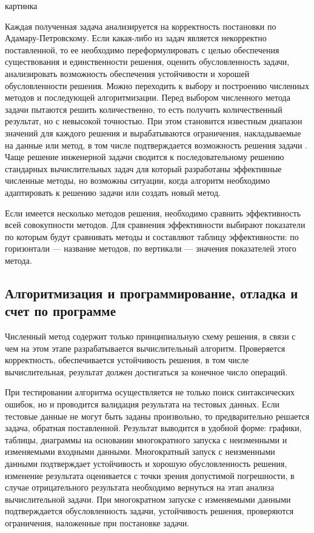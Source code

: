 \documentclass[12pt]{article}
\begin{document}
\begin{center}
    картинка
\end{center}

Каждая полученная задача анализируется на корректность постановки по Адамару-Петровскому. Если какая-либо из задач является некорректно поставленной, то ее необходимо переформулировать с целью обеспечения существования и единственности решения, оценить обусловленность задачи, анализировать возможность обеспечения устойчивости и хорошей обусловленности решения. Можно переходить к выбору и построению численных методов и последующей алгоритмизации. Перед выбором численного метода задачи пытаются решить количественно, то есть получить количественный результат, но с невысокой точностью. При этом становится известным диапазон значений для каждого решения и вырабатываются ограничения, накладываемые на данные или метод, в том числе подтверждается возможность решения задачи . Чаще решение инженерной задачи сводится к последовательному решению стандарных вычислительных задач для который разработаны эффективные численные методы, но возможны ситуации, когда алгоритм необходимо адаптировать к решению задачи или создать новый метод.

Если имеется несколько методов решения, необходимо сравнить эффективность всей совокупности методов. Для сравнения эффективности выбирают показатели по которым будут сравнивать методы и составляют таблицу эффективности: по горизонтали --- название методов, по вертикали --- значения показателей этого метода.

\subsection{Алгоритмизация и программирование, отладка и счет по программе}

Численный метод содержит только принципиальную схему решения, в связи с чем на этом этапе разрабатывается вычислительный алгоритм. Проверяется корректность, обеспечивается устойчивость решения, в том числе вычислительная, результат должен достигаться за конечное число операций. 

При тестировании алгоритма осуществляется не только поиск синтаксических ошибок, но и проводится валидация результата на тестовых данных. Если тестовые данные не могут быть заданы произвольно, то предварительно решается задача, обратная поставленной. Результат выводится в удобной форме: графики, таблицы, диаграммы на основании многократного запуска с неизменными и изменяемыми входными данными. Многократный запуск с неизменными данными подтверждает устойчивость и хорошую обусловленность решения, изменение результата оценивается с точки зрения допустимой погрешности, в случае отрицательного результата необходимо вернуться на этап анализа вычислительной задачи. При многократном запуске с изменяемыми данными подтверждается обусловленность задачи, устойчивость решения, проверяются ограничения, наложенные при постановке задачи.
\end{document}
